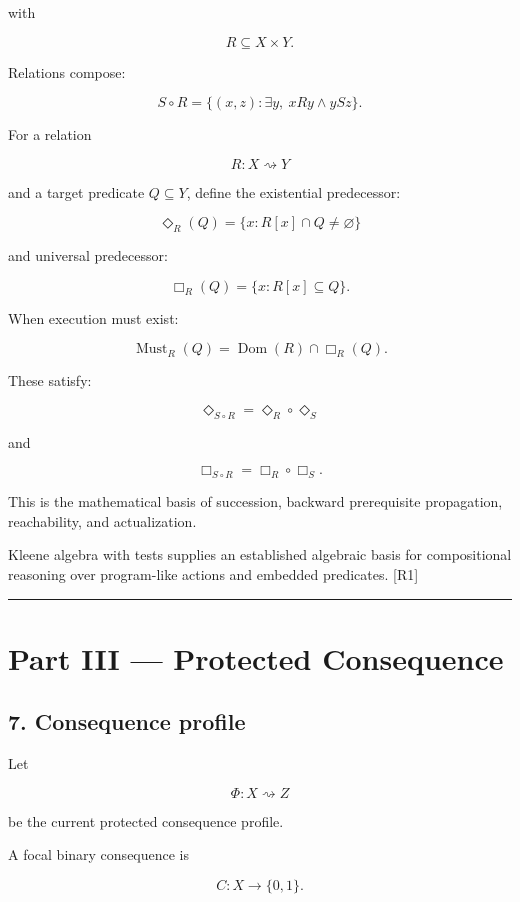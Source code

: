\documentclass[
]{article}
\begin{document}
with

\[
R\subseteq X\times Y.
\]

Relations compose:

\[
S\circ R
=
\{(x,z):\exists y,\ xRy\land ySz\}.
\]

For a relation

\[
R:X\rightsquigarrow Y
\]

and a target predicate \(Q\subseteq Y\), define the existential
predecessor:

\[
\boxed{
\Diamond_R(Q)
=
\{x:R[x]\cap Q\neq\varnothing\}
}
\]

and universal predecessor:

\[
\boxed{
\Box_R(Q)
=
\{x:R[x]\subseteq Q\}.
}
\]

When execution must exist:

\[
\boxed{
\operatorname{Must}_R(Q)
=
\operatorname{Dom}(R)\cap\Box_R(Q).
}
\]

These satisfy:

\[
\Diamond_{S\circ R}
=
\Diamond_R\circ\Diamond_S
\]

and

\[
\Box_{S\circ R}
=
\Box_R\circ\Box_S.
\]

This is the mathematical basis of succession, backward prerequisite
propagation, reachability, and actualization.

Kleene algebra with tests supplies an established algebraic basis for
compositional reasoning over program-like actions and embedded
predicates. {[}R1{]}

\begin{center}\rule{0.5\linewidth}{0.5pt}\end{center}

\section{Part III --- Protected
Consequence}\label{part-iii-protected-consequence}

\subsection{7. Consequence profile}\label{consequence-profile}

Let

\[
\Phi:X\rightsquigarrow Z
\]

be the current protected consequence profile.

A focal binary consequence is

\[
C:X\to\{0,1\}.
\]
\end{document}
